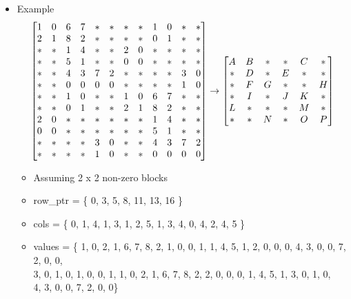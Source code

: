 \documentclass{article}
\newcommand{\bbm}{\begin{bmatrix}}
\newcommand{\ebm}{\end{bmatrix}}
\newcommand\tab[1][1cm]{\hspace*{#1}}
\begin{document}
\begin{itemize}
    \item Example
    \begin{equation*}
        \setcounter{MaxMatrixCols}{15}
        \bbm 
        1 & 0 & 6 & 7 & * & * & * & * & 1 & 0 & * & * \\
        2 & 1 & 8 & 2 & * & * & * & * & 0 & 1 & * & * \\
        * & * & 1 & 4 & * & * & 2 & 0 & * & * & * & * \\
        * & * & 5 & 1 & * & * & 0 & 0 & * & * & * & * \\
        * & * & 4 & 3 & 7 & 2 & * & * & * & * & 3 & 0 \\
        * & * & 0 & 0 & 0 & 0 & * & * & * & * & 1 & 0 \\
        * & * & 1 & 0 & * & * & 1 & 0 & 6 & 7 & * & * \\
        * & * & 0 & 1 & * & * & 2 & 1 & 8 & 2 & * & * \\
        2 & 0 & * & * & * & * & * & * & 1 & 4 & * & * \\
        0 & 0 & * & * & * & * & * & * & 5 & 1 & * & * \\
        * & * & * & * & 3 & 0 & * & * & 4 & 3 & 7 & 2 \\
        * & * & * & * & 1 & 0 & * & * & 0 & 0 & 0 & 0
        \ebm \rightarrow 
        \bbm
        A & B & * & * & C & * \\
        * & D & * & E & * & * \\
        * & F & G & * & * & H \\
        * & I & * & J & K & * \\
        L & * & * & * & M & * \\
        * & * & N & * & O & P
        \ebm
    \end{equation*}
    \begin{itemize}
        \item Assuming 2 x 2 non-zero blocks
        \item row\_ptr = \{ 0, 3, 5, 8, 11, 13, 16 \}
        \item cols = \{ 0, 1, 4, 1, 3, 1, 2, 5, 1, 3, 4, 0, 4, 2, 4, 5 \}
        \item values = \{ 1, 0, 2, 1, 6, 7, 8, 2, 1, 0, 0, 1,
                          1, 4, 5, 1, 2, 0, 0, 0, 4, 3, 0, 0, 
                          7, 2, 0, 0, \\
                \tab \tab 3, 0, 1, 0, 1, 0, 0, 1, 1, 0, 2, 1,
                          6, 7, 8, 2, 2, 0, 0, 0, 1, 4, 5, 1,
                          3, 0, 1, 0, \\
                \tab \tab 4, 3, 0, 0, 7, 2, 0, 0\}
    \end{itemize}
\end{itemize}
\end{document}
